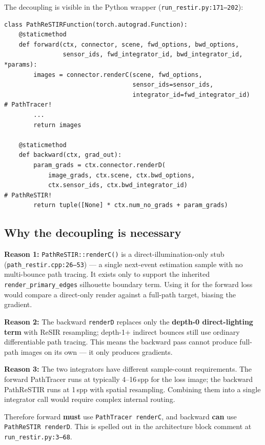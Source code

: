 The decoupling is visible in the Python wrapper (\texttt{run\_restir.py:171--202}):

\begin{lstlisting}[caption={PathReSTIRFunction --- decoupled forward/backward.},label={lst:restirfunc},float,floatplacement=t]
class PathReSTIRFunction(torch.autograd.Function):
    @staticmethod
    def forward(ctx, connector, scene, fwd_options, bwd_options,
                sensor_ids, fwd_integrator_id, bwd_integrator_id, *params):
        images = connector.renderC(scene, fwd_options,
                                   sensor_ids=sensor_ids,
                                   integrator_id=fwd_integrator_id)   # PathTracer!
        ...
        return images

    @staticmethod
    def backward(ctx, grad_out):
        param_grads = ctx.connector.renderD(
            image_grads, ctx.scene, ctx.bwd_options,
            ctx.sensor_ids, ctx.bwd_integrator_id)                    # PathReSTIR!
        return tuple([None] * ctx.num_no_grads + param_grads)
\end{lstlisting}

\subsection{Why the decoupling is necessary}

\noindent \textbf{Reason 1:} \texttt{PathReSTIR::renderC()} is a
direct-illumination-only stub (\texttt{path\_restir.cpp:26--53}) --- a single
next-event estimation sample with no multi-bounce path tracing. It exists
only to support the inherited \texttt{render\_primary\_edges} silhouette
boundary term. Using it for the forward loss would compare a direct-only
render against a full-path target, biasing the gradient.

\noindent \textbf{Reason 2:} The backward \texttt{renderD} replaces only the
\textbf{depth-0 direct-lighting term} with ReSIR resampling; depth-1+
indirect bounces still use ordinary differentiable path tracing. This means
the backward pass cannot produce full-path images on its own --- it only
produces gradients.

\noindent \textbf{Reason 3:} The two integrators have different sample-count
requirements. The forward PathTracer runs at typically 4--16\,spp for the
loss image; the backward PathReSTIR runs at 1\,spp with spatial resampling.
Combining them into a single integrator call would require complex internal
routing.

Therefore forward \textbf{must} use \texttt{PathTracer renderC}, and backward
\textbf{can} use \texttt{PathReSTIR renderD}. This is spelled out in the
architecture block comment at \texttt{run\_restir.py:3--68}.

